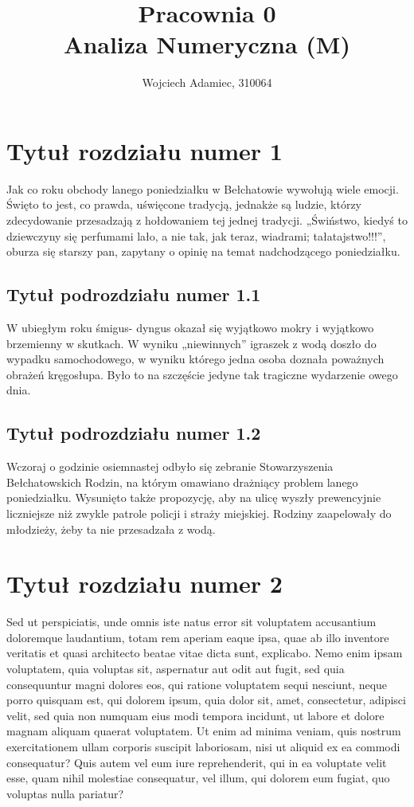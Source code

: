\documentclass[12pt,a4paper]{article}
\begin{document}
\author{Wojciech Adamiec, 310064}
\title{
	\textbf{Pracownia 0}\\
	\large Analiza Numeryczna (M)
}

\maketitle

\tableofcontents

\section{Tytuł rozdziału numer 1}
Jak co roku obchody lanego poniedziałku w Bełchatowie wywołują wiele emocji. Święto to jest, co prawda, uświęcone tradycją, jednakże są ludzie, którzy zdecydowanie przesadzają z hołdowaniem tej jednej tradycji. „Świństwo, kiedyś to dziewczyny się perfumami lało, a nie tak, jak teraz, wiadrami; tałatajstwo!!!”, oburza się starszy pan, zapytany o opinię na temat nadchodzącego poniedziałku.

\subsection{Tytuł podrozdziału numer 1.1}
W ubiegłym roku śmigus- dyngus okazał się wyjątkowo mokry i wyjątkowo brzemienny w skutkach. W wyniku „niewinnych” igraszek z wodą doszło do wypadku samochodowego, w wyniku którego jedna osoba doznała poważnych obrażeń kręgosłupa. Było to na szczęście jedyne tak tragiczne wydarzenie owego dnia.

\subsection{Tytuł podrozdziału numer 1.2}
Wczoraj o godzinie osiemnastej odbyło się zebranie Stowarzyszenia Bełchatowskich Rodzin, na którym omawiano drażniący problem lanego poniedziałku. Wysunięto także propozycję, aby na ulicę wyszły prewencyjnie liczniejsze niż zwykle patrole policji i straży miejskiej. Rodziny zaapelowały do młodzieży, żeby ta nie przesadzała z wodą.


\section{Tytuł rozdziału numer 2}
Sed ut perspiciatis, unde omnis iste natus error sit voluptatem accusantium doloremque laudantium, totam rem aperiam eaque ipsa, quae ab illo inventore veritatis et quasi architecto beatae vitae dicta sunt, explicabo. Nemo enim ipsam voluptatem, quia voluptas sit, aspernatur aut odit aut fugit, sed quia consequuntur magni dolores eos, qui ratione voluptatem sequi nesciunt, neque porro quisquam est, qui dolorem ipsum, quia dolor sit, amet, consectetur, adipisci velit, sed quia non numquam eius modi tempora incidunt, ut labore et dolore magnam aliquam quaerat voluptatem. Ut enim ad minima veniam, quis nostrum exercitationem ullam corporis suscipit laboriosam, nisi ut aliquid ex ea commodi consequatur? Quis autem vel eum iure reprehenderit, qui in ea voluptate velit esse, quam nihil molestiae consequatur, vel illum, qui dolorem eum fugiat, quo voluptas nulla pariatur?
\end{document}
